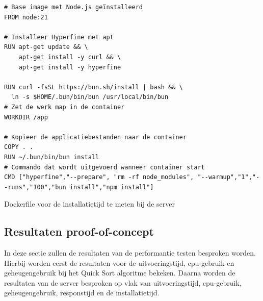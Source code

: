 \begin{listing}[H]
  \centering
  \begin{verbatim}
# Base image met Node.js geïnstalleerd
FROM node:21

# Installeer Hyperfine met apt
RUN apt-get update && \
    apt-get install -y curl && \
    apt-get install -y hyperfine

RUN curl -fsSL https://bun.sh/install | bash && \
  ln -s $HOME/.bun/bin/bun /usr/local/bin/bun
# Zet de werk map in de container
WORKDIR /app

# Kopieer de applicatiebestanden naar de container
COPY . .
RUN ~/.bun/bin/bun install
# Commando dat wordt uitgevoerd wanneer container start
CMD ["hyperfine","--prepare", "rm -rf node_modules", "--warmup","1","--runs","100","bun install","npm install"]
      \end{verbatim}
      \caption{\label{code:dockerinstall}Dockerfile voor de installatietijd te meten bij de server}
\end{listing}

\subsection{Resultaten proof-of-concept}
In deze sectie zullen de resultaten van de performantie testen besproken worden.
Hierbij worden eerst de resultaten voor de uitvoeringstijd, cpu-gebruik en geheugengebruik bij het Quick Sort algoritme bekeken.
Daarna worden de resultaten van de server besproken op vlak van uitvoeringstijd, cpu-gebruik, geheugengebruik, responstijd en de installatietijd.

